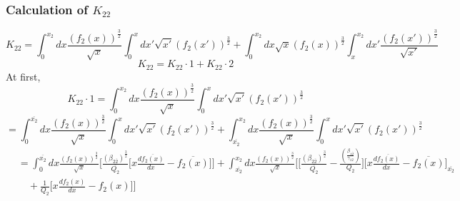 \documentclass[fleqn, 10pt]{article}
\begin{document}
            \subsubsection{Calculation of $K_{22}$}
            \begin{equation}
            K_{22} = \int^{x_2}_0 dx \frac{(f_2(x))^\frac{3}{2}}{\sqrt{x}} \int^{x}_0 dx' \sqrt{x'} (f_2(x'))^\frac{3}{2} + \int^{x_2}_0 dx \sqrt{x} (f_2(x))^\frac{3}{2} \int^{x_2}_{x} dx' \frac{(f_2(x'))^\frac{3}{2}}{\sqrt{x'}}
            \label{48}
            \end{equation}
            \begin{equation}
            K_{22} = K_{22}\cdot 1 + K_{22} \cdot 2
            \label{49}
            \end{equation}
            At first, 
            \begin{equation}
            K_{22}\cdot 1 = \int^{x_2}_0 dx \frac{(f_2(x))^\frac{3}{2}}{\sqrt{x}} \int^{x}_0 dx' \sqrt{x'} (f_2(x'))^\frac{3}{2} 
            \label{50}
            \end{equation}
            \begin{equation*}
            = \int^{\overline{x_2}}_0 dx \frac{(f_2(x))^\frac{3}{2}}{\sqrt{x}} \int^{x}_0 dx' \sqrt{x'} (f_2(x'))^\frac{3}{2} + \int^{x_2}_{\overline{x_2}} dx \frac{(f_2(x))^\frac{3}{2}}{\sqrt{x}} \int^{x}_0 dx' \sqrt{x'} (f_2(x'))^\frac{3}{2}
            \end{equation*}
            \begin{equation*}
            \begin{split}
            &= \int^{\overline{x_2}}_0 dx \frac{(f_2(x))^\frac{3}{2}}{\sqrt{x}} \biggl[\frac{(\beta_{2\overline{2}})^\frac{3}{2}}{\overline{Q_2}}\biggl[x\frac{d\overline{f_2(x)}}{dx} - \overline{f_2(x)}\biggr]\biggr] + \int^{x_2}_{\overline{x_2}} dx \frac{(f_2(x))^\frac{3}{2}}{\sqrt{x}} \Biggl[\biggl[\frac{(\beta_{2\overline{2}})^\frac{3}{2}}{\overline{Q_2}}  - \frac{\left(\frac{\beta_{1\overline{2}}}{\gamma_{12}}\right)}{Q_2}\biggr] \biggl[x \frac{d\overline{f_2(x)}}{dx} - \overline{f_2(x)}\biggr]_{\overline{x_2}} \\ & \quad+ \frac{1}{Q_2} \biggl[x\frac{df_2(x)}{dx} - f_2(x)\biggr]\Biggr]
            \end{split}
            \end{equation*}
\end{document}
